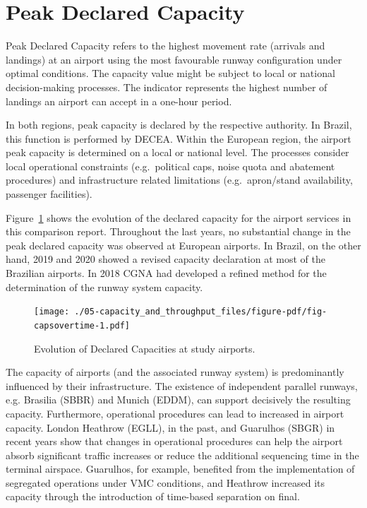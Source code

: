 \documentclass[
  a4paper,
  DIV=11,
  numbers=noendperiod]{scrreport}
\begin{document}
\hypertarget{peak-declared-capacity}{%
\section{Peak Declared Capacity}\label{peak-declared-capacity}}

Peak Declared Capacity refers to the highest movement rate (arrivals and
landings) at an airport using the most favourable runway configuration
under optimal conditions. The capacity value might be subject to local
or national decision-making processes. The indicator represents the
highest number of landings an airport can accept in a one-hour period.

In both regions, peak capacity is declared by the respective authority.
In Brazil, this function is performed by DECEA. Within the European
region, the airport peak capacity is determined on a local or national
level. The processes consider local operational constraints
(e.g.~political caps, noise quota and abatement procedures) and
infrastructure related limitations (e.g.~apron/stand availability,
passenger facilities).

Figure~\ref{fig-capsovertime} shows the evolution of the declared
capacity for the airport services in this comparison report. Throughout
the last years, no substantial change in the peak declared capacity was
observed at European airports. In Brazil, on the other hand, 2019 and
2020 showed a revised capacity declaration at most of the Brazilian
airports. In 2018 CGNA had developed a refined method for the
determination of the runway system capacity.

\begin{figure}[H]

{\centering \texttt{[image: ./05-capacity\_and\_throughput\_files/figure-pdf/fig-capsovertime-1.pdf]}

}

\caption{\label{fig-capsovertime}Evolution of Declared Capacities at
study airports.}

\end{figure}

The capacity of airports (and the associated runway system) is
predominantly influenced by their infrastructure. The existence of
independent parallel runways, e.g. Brasilia (SBBR) and Munich (EDDM),
can support decisively the resulting capacity. Furthermore, operational
procedures can lead to increased in airport capacity. London Heathrow
(EGLL), in the past, and Guarulhos (SBGR) in recent years show that
changes in operational procedures can help the airport absorb
significant traffic increases or reduce the additional sequencing time
in the terminal airspace. Guarulhos, for example, benefited from the
implementation of segregated operations under VMC conditions, and
Heathrow increased its capacity through the introduction of time-based
separation on final.
\end{document}
